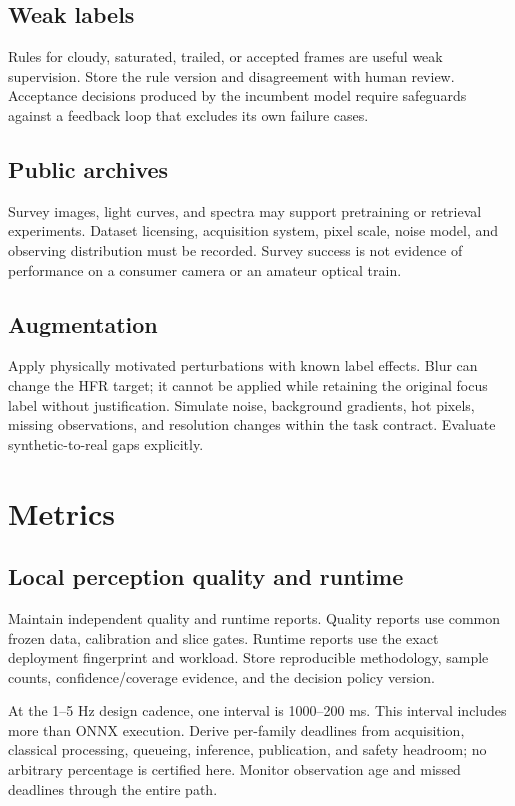 \documentclass[11pt,a4paper]{article}
\begin{document}
\subsection{Weak labels}
Rules for cloudy, saturated, trailed, or accepted frames are useful weak
supervision. Store the rule version and disagreement with human review.
Acceptance decisions produced by the incumbent model require safeguards
against a feedback loop that excludes its own failure cases.

\subsection{Public archives}
Survey images, light curves, and spectra may support pretraining or retrieval
experiments. Dataset licensing, acquisition system, pixel scale, noise model,
and observing distribution must be recorded. Survey success is not evidence
of performance on a consumer camera or an amateur optical train.

\subsection{Augmentation}
Apply physically motivated perturbations with known label effects. Blur can
change the HFR target; it cannot be applied while retaining the original focus
label without justification. Simulate noise, background gradients, hot pixels,
missing observations, and resolution changes within the task contract.
Evaluate synthetic-to-real gaps explicitly.

\section{Metrics}
\subsection{Local perception quality and runtime}
Maintain independent quality and runtime reports. Quality reports use common
frozen data, calibration and slice gates. Runtime reports use the exact
deployment fingerprint and workload. Store reproducible methodology, sample
counts, confidence/coverage evidence, and the decision policy version.

At the 1--5 Hz design cadence, one interval is 1000--200 ms. This interval
includes more than ONNX execution. Derive per-family deadlines from acquisition,
classical processing, queueing, inference, publication, and safety headroom;
no arbitrary percentage is certified here. Monitor observation age and missed
deadlines through the entire path.
\end{document}
